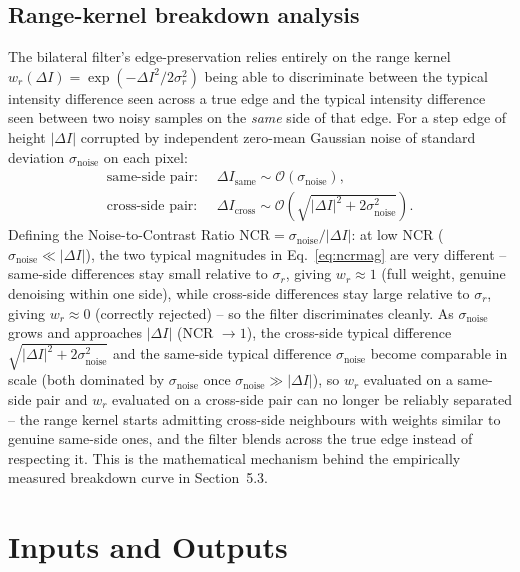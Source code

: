 \documentclass[11pt]{article}
\begin{document}
\subsection{Range-kernel breakdown analysis}

The bilateral filter's edge-preservation relies entirely on the range kernel
$w_r(\Delta I)=\exp(-\Delta I^2/2\sigma_r^2)$ being able to discriminate between the
typical intensity difference seen across a true edge and the typical intensity
difference seen between two noisy samples on the \emph{same} side of that edge. For a
step edge of height $|\Delta I|$ corrupted by independent zero-mean Gaussian noise of
standard deviation $\sigma_{\text{noise}}$ on each pixel:
\begin{align}
  \text{same-side pair: } &\ \Delta I_{\text{same}} \sim \mathcal{O}(\sigma_{\text{noise}}), \\
  \text{cross-side pair: } &\ \Delta I_{\text{cross}} \sim \mathcal{O}\!\left(\sqrt{|\Delta I|^2+2\sigma_{\text{noise}}^2}\right).
  \label{eq:ncrmag}
\end{align}
Defining the Noise-to-Contrast Ratio $\text{NCR}=\sigma_{\text{noise}}/|\Delta I|$: at
low NCR ($\sigma_{\text{noise}}\ll|\Delta I|$), the two typical magnitudes in
Eq.~\eqref{eq:ncrmag} are very different -- same-side differences stay small relative to
$\sigma_r$, giving $w_r\approx 1$ (full weight, genuine denoising within one side),
while cross-side differences stay large relative to $\sigma_r$, giving $w_r\approx 0$
(correctly rejected) -- so the filter discriminates cleanly. As $\sigma_{\text{noise}}$
grows and approaches $|\Delta I|$ (NCR $\to 1$), the cross-side typical difference
$\sqrt{|\Delta I|^2+2\sigma_{\text{noise}}^2}$ and the same-side typical difference
$\sigma_{\text{noise}}$ become comparable in scale (both dominated by
$\sigma_{\text{noise}}$ once $\sigma_{\text{noise}}\gg|\Delta I|$), so $w_r$ evaluated
on a same-side pair and $w_r$ evaluated on a cross-side pair can no longer be reliably
separated -- the range kernel starts admitting cross-side neighbours with weights
similar to genuine same-side ones, and the filter blends across the true edge instead of
respecting it. This is the mathematical mechanism behind the empirically measured
breakdown curve in Section~5.3.

\section{Inputs and Outputs}
\end{document}
